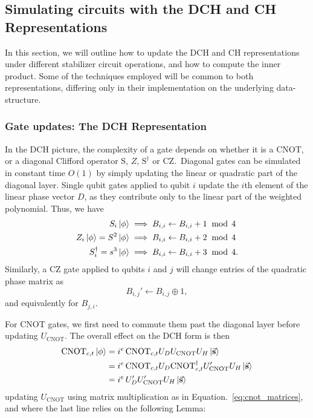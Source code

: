 \subsection{Simulating circuits with the DCH and CH Representations}\label{sec:dch_ch_methods}
In this section, we will outline how to update the DCH and CH representations under different stabilizer circuit operations, and how to compute the inner product. Some of the techniques employed will be common to both representations, differing only in their implementation on the underlying data-structure.
\subsubsection*{Gate updates: The DCH Representation}
In the DCH picture, the complexity of a gate depends on whether it is a CNOT, or a diagonal Clifford operator S, $Z$, $\text{S}^{\dagger}$ or CZ.\ Diagonal gates can be simulated in constant time $O(1)$ by simply updating the linear or quadratic part of the diagonal layer. Single qubit gates applied to qubit $i$ update the $i$th element of the linear phase vector $D$, as they contribute only to the linear part of the weighted polynomial. Thus, we have
\begin{align}
S_{i}\ket{\phi} &\implies B_{i,i}\leftarrow B_{i,i} + 1\;\bmod\,4 \\
Z_{i}\ket{\phi} = S^{2}\ket{\phi} &\implies B_{i,i}\leftarrow B_{i,i} +2\;\bmod\,4 \\
S_{i}^{\dagger} = s^{3}\ket{\phi} & \implies B_{i,i}\leftarrow B_{i,i} + 3\;\bmod\,4. 
\end{align}
Similarly, a CZ gate applied to qubits $i$ and $j$ will change entries of the quadratic phase matrix as
\begin{equation}
B_{i,j}' \leftarrow B_{i,j}\oplus 1,
\end{equation}
and equivalently for $B_{j,i}$.\par
For CNOT gates, we first need to commute them past the diagonal layer before updating $U_{\text{CNOT}}$. The overall effect on the DCH form is then
\begin{align}
\text{CNOT}_{c,t}\ket{\phi} &= i^{e}\,\text{CNOT}_{c,t}U_{D}U_{\text{CNOT}}U_{H} \ket{\va{s}}\nonumber \\
&= i^{e}\,\text{CNOT}_{c,t}U_{D}\text{CNOT}_{c,t}^{\dagger} U_{\text{CNOT}}' U_{H}\ket{\va{s}} \nonumber \\
&= i^{e}\,U_{D}'U_{\text{CNOT}}'U_{H}\ket{\va{s}}
\end{align}
updating $U_{\text{CNOT}}$ using matrix multiplication as in Equation.~\ref{eq:cnot_matrices}, and where the last line relies on the following Lemma:
